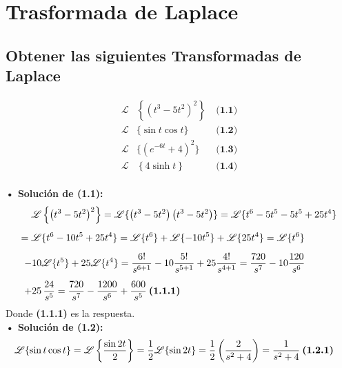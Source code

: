 \documentclass[letterpaper, 12pt]{article}
\begin{document}
\thispagestyle{fancy}
\section*{Trasformada de Laplace}
\subsection*{Obtener las siguientes Transformadas de Laplace}
\justify
{\large
    \begin{equation*}
        \begin{aligned}
            \mathscr{L} & \left\{\left(t^3-5t^2\right)^2\right\}\: & \textbf{(1.1)}\\
            \mathscr{L} & \{\sin t \cos t\}\: & \textbf{(1.2)}\\
            \mathscr{L} & \{\left(e^{-6t}+4\right)^2\}\: & \textbf{(1.3)}\\
            \mathscr{L} & \left\{4\sinh t\right\}\: & \textbf{(1.4)}
        \end{aligned}
    \end{equation*}
\\\newline
{\large \textbf{• Solución de (1.1):}
\begin{equation*}
    \begin{aligned}
        \mathscr{L}&\left\{\left(t^3-5t^2\right)^2\right\}=\mathscr{L}\{\left(t^3-5t^2\right)\left(t^3-5t^2\right)\}=\mathscr{L}\{t^6-5t^5-5t^5+25t^4\}\\[5pt]
        =\mathscr{L}&\{t^6-10t^5+25t^4\}=\mathscr{L}\{t^6\}+\mathscr{L}\{-10t^5\}+\mathscr{L}\{25t^4\}=\mathscr{L}\{t^6\}\\[5pt]
        -10&\mathscr{L}\{t^5\}+25\mathscr{L}\{t^4\}={6! \over s^{6+1}}-10{5! \over s^{5+1}}+25{4! \over s^{4+1}}={720 \over s^7}-10{120 \over s^6}\\[5pt]
        +25&\,{24 \over s^5}={720 \over s^7}-{1200 \over s^6}+{600 \over s^5}\: \textbf{(1.1.1)}
    \end{aligned}
\end{equation*}}
\justify
Donde \textbf{(1.1.1)} es la respuesta.\\\newline
\justify
{\large \textbf{• Solución de (1.2):}
\begin{equation*}
    \begin{aligned}
        \mathscr{L}&\{\sin t \cos t\}=\mathscr{L}\left\{{\sin 2t \over 2}\right\}=\frac{1}{2}\mathscr{L}\{\sin 2t\}=\frac{1}{2}\left({2 \over s^2+4}\right)={1 \over s^2+4}\: \textbf{(1.2.1)}

\end{aligned}
\end{equation*}}}
\end{document}
